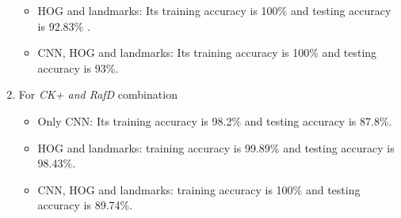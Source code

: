 \begin{enumerate}
\begin{itemize}[noitemsep,nolistsep]
    \item HOG and landmarks: Its training accuracy is 100\% and testing accuracy is 92.83\% .
    \item CNN, HOG and landmarks: Its training accuracy is 100\% and testing accuracy is 93\%.
\end{itemize}

\item For \textit{CK+ and RafD} combination \newline
\begin{itemize}[noitemsep,nolistsep]
    \item Only CNN: Its training accuracy is 98.2\% and testing accuracy is 87.8\%.

    \item HOG and landmarks: training accuracy is 99.89\% and testing accuracy is 98.43\%.
    \item CNN, HOG and landmarks: training accuracy is 100\% and testing accuracy is 89.74\%.
\end{itemize}
\end{enumerate}
